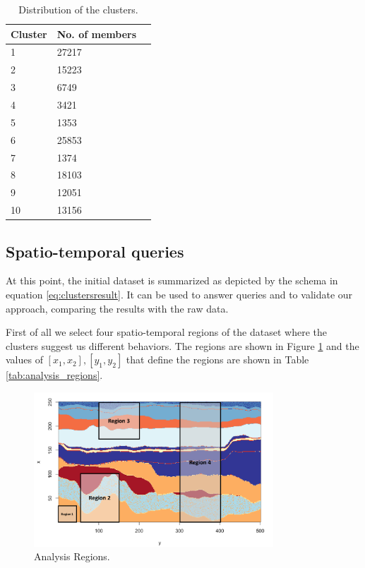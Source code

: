 \begin{table}
\begin{center}
    \begin{tabular}{|l|l|l|}
    \hline
    \textbf{Cluster} & \textbf{No. of members}         \\ \hline
    1     & 27217              \\ \hline
    2     & 15223             \\ \hline
    3     & 6749            \\ \hline
    4     & 3421               \\ \hline
    5     & 1353                \\ \hline
    6     & 25853               \\ \hline
    7     & 1374                 \\ \hline
    8     & 18103                 \\ \hline
    9     & 12051            \\ \hline
    10   & 13156              \\ \hline
    \end{tabular}
    \caption {Distribution of the clusters.}
    \label{tab:distribution_of_the_clusters}
    \end{center}
\end{table}

\subsection{Spatio-temporal queries}\label{spatio_temporal_queries}
At this point, the initial dataset is summarized as depicted by the schema in equation \ref{eq:clustersresult}. It can be used to answer queries and to validate our approach, comparing the results with the raw data.

First of all we select four spatio-temporal regions of the dataset where the clusters suggest us different behaviors. The regions are shown in Figure \ref{fig:analysis_regions} and the values of $[x_{1}, x_{2}], [y_{1}, y_{2}]$ that define the regions are shown in Table \ref{tab:analysis_regions}. 

\begin{figure}[H]
    \centering
    \includegraphics[width=0.8\textwidth]{images/regions.png}
    \caption{Analysis Regions.}
    \label{fig:analysis_regions}
\end{figure}

